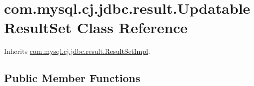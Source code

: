 \hypertarget{classcom_1_1mysql_1_1cj_1_1jdbc_1_1result_1_1_updatable_result_set}{}\section{com.\+mysql.\+cj.\+jdbc.\+result.\+Updatable\+Result\+Set Class Reference}
\label{classcom_1_1mysql_1_1cj_1_1jdbc_1_1result_1_1_updatable_result_set}


Inherits \mbox{\hyperlink{classcom_1_1mysql_1_1cj_1_1jdbc_1_1result_1_1_result_set_impl}{com.\+mysql.\+cj.\+jdbc.\+result.\+Result\+Set\+Impl}}.

\subsection*{Public Member Functions}
